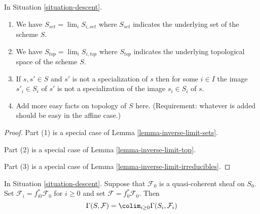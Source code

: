 \begin{lemma}
\label{lemma-topology-limit}
In Situation \ref{situation-descent}.
\begin{enumerate}
\item We have $S_{set} = \lim_i S_{i, set}$ where $S_{set}$
indicates the underlying set of the scheme $S$.
\item We have $S_{top} = \lim_i S_{i, top}$ where $S_{top}$
indicates the underlying topological space of the scheme $S$.
\item If $s, s' \in S$ and $s'$ is not a specialization of $s$
then for some $i \in I$ the image $s'_i \in S_i$ of $s'$ is not
a specialization of the image $s_i \in S_i$ of $s$.
\item Add more easy facts on topology of $S$ here.
(Requirement: whatever is added should be easy in the affine case.)
\end{enumerate}
\end{lemma}

\begin{proof}
Part (1) is a special case of Lemma \ref{lemma-inverse-limit-sets}.

\medskip\noindent
Part (2) is a special case of Lemma \ref{lemma-inverse-limit-top}.

\medskip\noindent
Part (3) is a special case of Lemma \ref{lemma-inverse-limit-irreducibles}.
\end{proof}

\begin{lemma}
\label{lemma-descend-section}
In Situation \ref{situation-descent}.
Suppose that $\mathcal{F}_0$ is a quasi-coherent sheaf on $S_0$.
Set $\mathcal{F}_i = f_{i0}^*\mathcal{F}_0$ for $i \geq 0$ and set
$\mathcal{F} = f_0^*\mathcal{F}_0$.
Then
$$
\Gamma(S, \mathcal{F}) = \colim_{i \geq 0} \Gamma(S_i, \mathcal{F}_i)
$$
\end{lemma}

